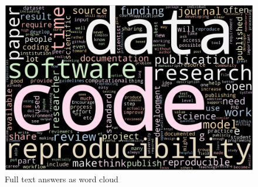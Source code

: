\documentclass{article}
\begin{document}
\begin{figure}[h!]
    \centering
    \includegraphics[width=\textwidth]{../word_cloud.png}
	\caption{Full text answers as word cloud }
    \label{fig:wc}
\end{figure}
\end{document}
